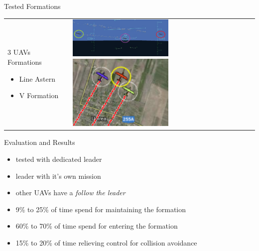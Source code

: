 \documentclass{beamer}
\begin{document}
\begin{frame}{Tested Formations}

\begin{tabular}{l l}
\begin{minipage}{0.5\textwidth}
3 UAVs Formations
\begin{itemize}
\item{Line Astern}
\item{V Formation}
\end{itemize}\end{minipage}
&
\begin{minipage}{0.5\textwidth}
\includegraphics[width=2in]{img/line2.png}
\newline
\includegraphics[width=2in]{img/vqgc.png}
\end{minipage}
\end{tabular}
\end{frame}

\begin{frame}{Evaluation and Results}
\begin{itemize}
\item tested with dedicated leader
\item leader with it's own mission
\item other UAVs have a \textit{follow the leader}
\item 9\% to 25\% of time spend for maintaining the formation
\item 60\% to 70\% of time spend for entering the formation
\item 15\% to 20\% of time relieving control for collision avoidance
\end{itemize}
\end{frame}
\end{document}

